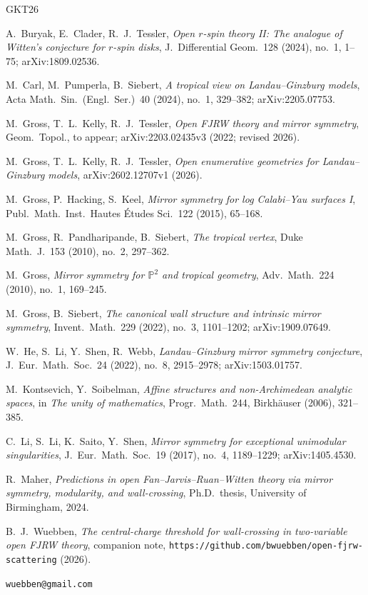 \documentclass[11pt]{amsart}
\theoremstyle{definition}
\theoremstyle{remark}
\newcommand{\PP}{\mathbb{P}}
\begin{document}
\begin{thebibliography}{GKT26}

 A.~Buryak, E.~Clader, R.~J.~Tessler,
\emph{Open $r$-spin theory II: The analogue of Witten's conjecture for
$r$-spin disks}, J.\ Differential Geom.\ 128 (2024), no.~1, 1--75;
arXiv:1809.02536.

 M.~Carl, M.~Pumperla, B.~Siebert,
\emph{A tropical view on Landau--Ginzburg models},
Acta Math.\ Sin.\ (Engl.\ Ser.)\ 40 (2024), no.~1, 329--382;
arXiv:2205.07753.

 M.~Gross, T.~L.~Kelly, R.~J.~Tessler,
\emph{Open FJRW theory and mirror symmetry}, Geom.\ Topol., to appear;
arXiv:2203.02435v3 (2022; revised 2026).

 M.~Gross, T.~L.~Kelly, R.~J.~Tessler,
\emph{Open enumerative geometries for Landau--Ginzburg models},
arXiv:2602.12707v1 (2026).

 M.~Gross, P.~Hacking, S.~Keel,
\emph{Mirror symmetry for log Calabi--Yau surfaces I},
Publ.\ Math.\ Inst.\ Hautes \'Etudes Sci.\ 122 (2015), 65--168.

 M.~Gross, R.~Pandharipande, B.~Siebert,
\emph{The tropical vertex}, Duke Math.\ J.\ 153 (2010), no.~2, 297--362.

 M.~Gross,
\emph{Mirror symmetry for $\PP^{2}$ and tropical geometry},
Adv.\ Math.\ 224 (2010), no.~1, 169--245.

 M.~Gross, B.~Siebert,
\emph{The canonical wall structure and intrinsic mirror symmetry},
Invent.\ Math.\ 229 (2022), no.~3, 1101--1202; arXiv:1909.07649.

 W.~He, S.~Li, Y.~Shen, R.~Webb,
\emph{Landau--Ginzburg mirror symmetry conjecture},
J.\ Eur.\ Math.\ Soc.\ 24 (2022), no.~8, 2915--2978; arXiv:1503.01757.

 M.~Kontsevich, Y.~Soibelman,
\emph{Affine structures and non-Archimedean analytic spaces}, in
\emph{The unity of mathematics}, Progr.\ Math.\ 244, Birkh\"auser (2006), 321--385.

 C.~Li, S.~Li, K.~Saito, Y.~Shen,
\emph{Mirror symmetry for exceptional unimodular singularities},
J.\ Eur.\ Math.\ Soc.\ 19 (2017), no.~4, 1189--1229; arXiv:1405.4530.

 R.~Maher,
\emph{Predictions in open Fan--Jarvis--Ruan--Witten theory via mirror symmetry,
modularity, and wall-crossing}, Ph.D.\ thesis, University of Birmingham, 2024.

 B.~J.~Wuebben,
\emph{The central-charge threshold for wall-crossing in two-variable open FJRW
theory}, companion note,
\texttt{https://github.com/bwuebben/open-fjrw-scattering} (2026).

\end{thebibliography}

\bigskip
{} \texttt{wuebben@gmail.com}
\end{document}
